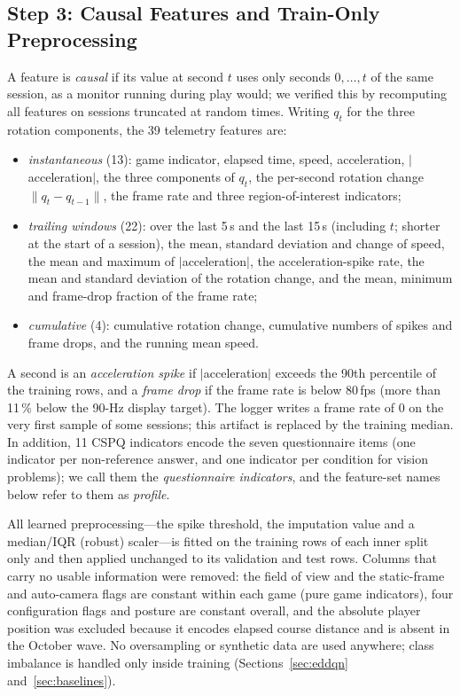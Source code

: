 \subsection{Step 3: Causal Features and Train-Only Preprocessing}
\label{sec:features}
A feature is \emph{causal} if its value at second $t$ uses only seconds $0,\dots,t$ of the same session, as a monitor running during play would; we verified this by recomputing all features on sessions truncated at random times. Writing $q_t$ for the three rotation components, the 39 telemetry features are:
\begin{itemize}
\item \emph{instantaneous} (13): game indicator, elapsed time, speed, acceleration, $|$acceleration$|$, the three components of $q_t$, the per-second rotation change $\lVert q_t-q_{t-1}\rVert$, the frame rate and three region-of-interest indicators;
\item \emph{trailing windows} (22): over the last 5\,s and the last 15\,s (including $t$; shorter at the start of a session), the mean, standard deviation and change of speed, the mean and maximum of $|$acceleration$|$, the acceleration-spike rate, the mean and standard deviation of the rotation change, and the mean, minimum and frame-drop fraction of the frame rate;
\item \emph{cumulative} (4): cumulative rotation change, cumulative numbers of spikes and frame drops, and the running mean speed.
\end{itemize}
A second is an \emph{acceleration spike} if $|$acceleration$|$ exceeds the 90th percentile of the training rows, and a \emph{frame drop} if the frame rate is below 80\,fps (more than 11\,\% below the 90-Hz display target). The logger writes a frame rate of 0 on the very first sample of some sessions; this artifact is replaced by the training median. In addition, 11 CSPQ indicators encode the seven questionnaire items (one indicator per non-reference answer, and one indicator per condition for vision problems); we call them the \emph{questionnaire indicators}, and the feature-set names below refer to them as \emph{profile}.

All learned preprocessing---the spike threshold, the imputation value and a median/IQR (robust) scaler---is fitted on the training rows of each inner split only and then applied unchanged to its validation and test rows. Columns that carry no usable information were removed: the field of view and the static-frame and auto-camera flags are constant within each game (pure game indicators), four configuration flags and posture are constant overall, and the absolute player position was excluded because it encodes elapsed course distance and is absent in the October wave. No oversampling or synthetic data are used anywhere; class imbalance is handled only inside training (Sections~\ref{sec:eddqn} and~\ref{sec:baselines}).

